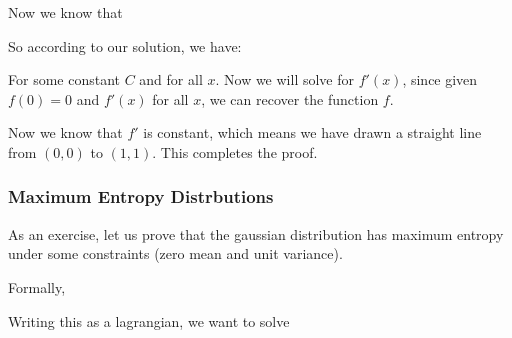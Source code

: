 \documentclass[12pt]{article}
\begin{document}

Now we know that

So according to our solution, we have:

For some constant $C$ and for all $x$. Now we will solve for $f'(x)$, since given $f(0) = 0$ and $f'(x)$ for all $x$, we can recover the function $f$.


Now we know that $f'$ is constant, which means we have drawn a straight line from $(0,0)$ to $(1,1)$. This completes the proof.

\subsubsection{Maximum Entropy Distrbutions}

As an exercise, let us prove that the gaussian distribution has maximum entropy under some constraints (zero mean and unit variance). 

Formally, 

Writing this as a lagrangian, we want to solve
\end{document}
